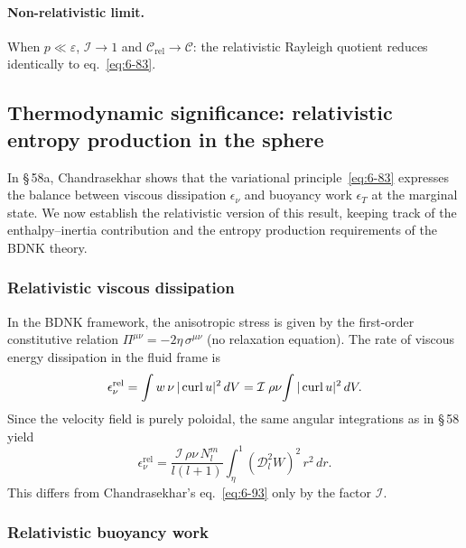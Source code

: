 \paragraph{Non-relativistic limit.}
When $p \ll \varepsilon$, $\mathcal{I} \to 1$ and
$\mathcal{C}_{\mathrm{rel}} \to \mathcal{C}$: the relativistic
Rayleigh quotient reduces identically to eq.~\eqref{eq:6-83}.


\subsection{Thermodynamic significance: relativistic entropy production
in the sphere}
\label{sec:rel-58-thermo}

In \S\,58a, Chandrasekhar shows that the variational
principle~\eqref{eq:6-83} expresses the balance between viscous
dissipation $\epsilon_{\nu}$ and buoyancy work $\epsilon_{T}$ at the
marginal state.  We now establish the relativistic version of this
result, keeping track of the enthalpy--inertia contribution and
the entropy production requirements of the BDNK theory.

\subsubsection{Relativistic viscous dissipation}
\label{sec:rel-58-viscous}

In the BDNK framework, the anisotropic stress is given by the
first-order constitutive relation $\Pi^{\mu\nu} = -2\eta\,\sigma^{\mu\nu}$
(no relaxation equation).  The rate of viscous energy dissipation in the
fluid frame is
\begin{equation}
  \epsilon_{\nu}^{\mathrm{rel}}
  = \int w\,\nu\,|\operatorname{curl}u|^{2}\,dV
  = \mathcal{I}\;\rho\nu\!\int |\operatorname{curl}u|^{2}\,dV.
  \label{eq:rel-86}
\end{equation}
Since the velocity field is purely poloidal, the same angular
integrations as in \S\,58 yield
\begin{equation}
  \epsilon_{\nu}^{\mathrm{rel}}
  = \frac{\mathcal{I}\,\rho\nu\,N_{l}^{m}}
         {l(l+1)}
    \int_{\eta}^{1}(\mathscr{D}_{l}^{2}W)^{2}\,r^{2}\,dr.
  \label{eq:rel-93}
\end{equation}
This differs from Chandrasekhar's eq.~\eqref{eq:6-93} only by the
factor $\mathcal{I}$.

\subsubsection{Relativistic buoyancy work}
\label{sec:rel-58-buoyancy}

